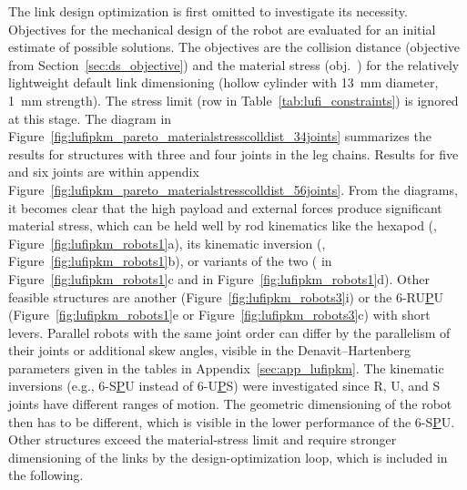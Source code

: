 The link design optimization is first omitted to investigate its necessity.
Objectives for the mechanical design of the robot are evaluated for an initial estimate of possible solutions.
The objectives are the collision distance (objective  from Section~\ref{sec:ds_objective}) and the material stress (obj.~) for the relatively lightweight default link dimensioning (hollow cylinder with \SI{13}{\milli\metre} diameter, \SI{1}{\milli\metre} strength).
The stress limit (row  in Table~\ref{tab:lufi_constraints}) is ignored at this stage.
The  diagram in Figure~\ref{fig:lufipkm_pareto_materialstresscolldist_34joints} summarizes the results for structures with three and four joints in the leg chains.
Results for five and six joints are within appendix Figure~\ref{fig:lufipkm_pareto_materialstresscolldist_56joints}.
From the diagrams, it becomes clear that the high payload and external forces produce significant material stress, which can be held well by rod kinematics like the hexapod %
%
(, Figure~\ref{fig:lufipkm_robots1}a), its kinematic inversion (, Figure~\ref{fig:lufipkm_robots1}b), or variants of the two ( in Figure~\ref{fig:lufipkm_robots1}c and  in Figure~\ref{fig:lufipkm_robots1}d).
Other feasible structures are another   (Figure~\ref{fig:lufipkm_robots3}i) or the 6-{R}{U}\underline{P}{U} (Figure~\ref{fig:lufipkm_robots1}e or Figure~\ref{fig:lufipkm_robots3}c) with short levers.
Parallel robots %
%
with the same joint order can differ by the parallelism of their joints or additional skew angles, visible in the Denavit--Hartenberg parameters given in the tables in Appendix~\ref{sec:app_lufipkm}.
The kinematic inversions (e.g., 6-S\underline{P}U instead of 6-U\underline{P}S) were investigated since R, U, and S joints have different ranges of motion.
The geometric dimensioning of the robot then has to be different, which is visible in the lower performance of the 6-S\underline{P}U.
Other structures exceed the material-stress limit and require stronger dimensioning of the links by the design-optimization loop, which is included in the following.
\vspace{3pt}
